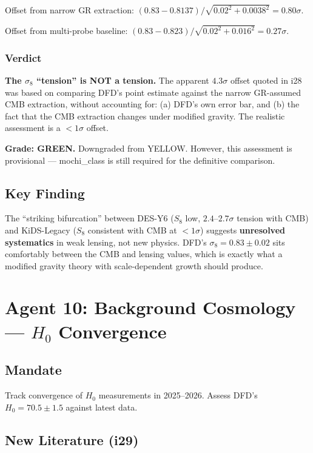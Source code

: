 \documentclass[11pt,a4paper]{article}
\begin{document}
Offset from narrow GR extraction: $(0.83 - 0.8137)/\sqrt{0.02^2 + 0.0038^2} = 0.80\sigma$.

Offset from multi-probe baseline: $(0.83 - 0.823)/\sqrt{0.02^2 + 0.016^2} = 0.27\sigma$.

\subsubsection{Verdict}

\textbf{The $\sigma_8$ ``tension'' is NOT a tension.} The apparent $4.3\sigma$ offset quoted in i28 was based on comparing DFD's point estimate against the narrow GR-assumed CMB extraction, without accounting for: (a) DFD's own error bar, and (b) the fact that the CMB extraction changes under modified gravity. The realistic assessment is a $< 1\sigma$ offset.

\textbf{Grade: GREEN.} Downgraded from YELLOW. However, this assessment is provisional --- mochi\_class is still required for the definitive comparison.

\subsection{Key Finding}
The ``striking bifurcation'' between DES-Y6 ($S_8$ low, $2.4$--$2.7\sigma$ tension with CMB) and KiDS-Legacy ($S_8$ consistent with CMB at $<1\sigma$) suggests \textbf{unresolved systematics} in weak lensing, not new physics. DFD's $\sigma_8 = 0.83 \pm 0.02$ sits comfortably between the CMB and lensing values, which is exactly what a modified gravity theory with scale-dependent growth should produce.

\section{Agent 10: Background Cosmology --- $H_0$ Convergence}

\subsection{Mandate}
Track convergence of $H_0$ measurements in 2025--2026. Assess DFD's $H_0 = 70.5 \pm 1.5$ against latest data.

\subsection{New Literature (i29)}
\end{document}
